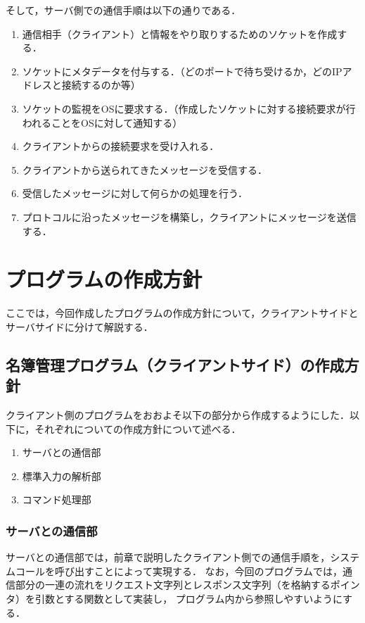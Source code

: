 \documentclass[11pt]{jsarticle}
\begin{document}
そして，サーバ側での通信手順は以下の通りである．

\begin{enumerate}
      \item 通信相手（クライアント）と情報をやり取りするためのソケットを作成する．
      \item ソケットにメタデータを付与する．（どのポートで待ち受けるか，どのIPアドレスと接続するのか等）
      \item ソケットの監視をOSに要求する．（作成したソケットに対する接続要求が行われることをOSに対して通知する）
      \item クライアントからの接続要求を受け入れる．
      \item クライアントから送られてきたメッセージを受信する．
      \item 受信したメッセージに対して何らかの処理を行う．
      \item プロトコルに沿ったメッセージを構築し，クライアントにメッセージを送信する．
\end{enumerate}

\section{プログラムの作成方針}

ここでは，今回作成したプログラムの作成方針について，クライアントサイドとサーバサイドに分けて解説する．

\subsection{名簿管理プログラム（クライアントサイド）の作成方針}

クライアント側のプログラムをおおよそ以下の部分から作成するようにした．以下に，それぞれについての作成方針について述べる．

\begin{enumerate}
      \item サーバとの通信部
      \item 標準入力の解析部
      \item コマンド処理部
\end{enumerate}

\subsubsection{サーバとの通信部}
サーバとの通信部では，前章で説明したクライアント側での通信手順を，システムコールを呼び出すことによって実現する．
なお，今回のプログラムでは，通信部分の一連の流れをリクエスト文字列とレスポンス文字列（を格納するポインタ）を引数とする関数として実装し，
プログラム内から参照しやすいようにする．
\end{document}
